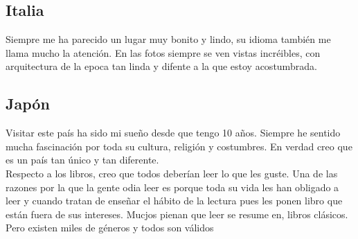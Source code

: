 \documentclass[12pt, letterpaper]{article}
\begin{document}
\subsection{Italia}
Siempre me ha parecido un lugar muy bonito y lindo, su idioma también me llama  mucho la atención. En las fotos siempre se ven vistas incréibles, con arquitectura de la epoca tan linda y difente a la que estoy acostumbrada. 
\subsection{Japón}
Visitar este país ha sido mi sueño desde que tengo 10 años. Siempre he sentido mucha fascinación por toda su cultura, religión y costumbres. En verdad creo que es un país tan único y tan diferente. \\



{\color{purple}Respecto a los libros, creo que todos deberían leer lo que les guste. Una de las razones por la que la gente odia leer es porque toda su vida les han obligado a leer y cuando tratan de enseñar}
{\color{green}el hábito de la lectura pues les ponen libro que están fuera de sus intereses. Mucjos pienan que leer se resume en, libros clásicos. Pero existen miles de géneros y todos son válidos}
\end{document}
